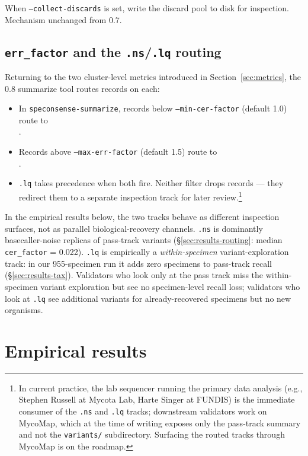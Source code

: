 \documentclass[11pt]{article}
\begin{document}
When \texttt{--collect-discards} is set, write the discard pool to disk for
inspection. Mechanism unchanged from 0.7.

\subsection{\texttt{err\_factor} and the \texttt{.ns}/\texttt{.lq} routing}

Returning to the two cluster-level metrics introduced in
Section~\ref{sec:metrics}, the 0.8 summarize tool routes records on each:

\begin{itemize}
  \item In \texttt{speconsense-summarize}, records below
  \texttt{--min-cer-factor} (default 1.0) route to \\
  .
  \item Records above \texttt{--max-err-factor} (default 1.5) route to \\
  .
  \item \texttt{.lq} takes precedence when both fire. Neither filter drops
  records --- they redirect them to a separate inspection track for
  later review.\footnote{In current practice, the lab sequencer running
  the primary data analysis (e.g., Stephen Russell at Mycota Lab, Harte
  Singer at FUNDIS) is the immediate consumer of the \texttt{.ns} and
  \texttt{.lq} tracks; downstream validators work on MycoMap, which at
  the time of writing exposes only the pass-track summary and not the
  \texttt{variants/} subdirectory. Surfacing the routed tracks through
  MycoMap is on the roadmap.}
\end{itemize}

In the empirical results below, the two tracks behave as different
inspection surfaces, not as parallel biological-recovery channels.
\texttt{.ns} is dominantly basecaller-noise replicas of pass-track
variants (§\ref{sec:results-routing}: median \texttt{cer\_factor} =
0.022). \texttt{.lq} is empirically a \emph{within-specimen}
variant-exploration track: in our 955-specimen run it adds zero
specimens to pass-track recall (§\ref{sec:results-tax}). Validators
who look only at the pass track miss the within-specimen variant
exploration but see no specimen-level recall loss; validators who
look at \texttt{.lq} see additional variants for already-recovered
specimens but no new organisms.

\section{Empirical results}
\label{sec:results}
\end{document}
